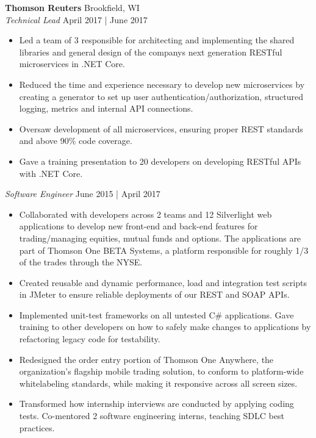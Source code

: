 \documentclass[a4paper]{article}
\begin{document}
\textbf{Thomson Reuters} \hfill Brookfield, WI\\
\textit{Technical Lead} \hfill April 2017 | June 2017\\
\vspace{-1mm}
\begin{itemize} \itemsep 1pt
	\item Led a team of 3 responsible for architecting and implementing the shared libraries and general design of the company\textquotesingle{}s next generation RESTful microservices in .NET Core.
	\item Reduced the time and experience necessary to develop new microservices by creating a generator to set up user authentication/authorization, structured logging, metrics and internal API connections.
	\item Oversaw development of all microservices, ensuring proper REST standards and above 90\% code coverage.
	\item Gave a training presentation to 20 developers on developing RESTful APIs with .NET Core.
\end{itemize}
\vspace{-1mm}
\textit{Software Engineer} \hfill June 2015 | April 2017\\
\vspace{-1mm}
\begin{itemize} \itemsep 1pt
	\item Collaborated with developers across 2 teams and 12 Silverlight web applications to develop new front-end and back-end features for trading/managing equities, mutual funds and options. The applications are part of Thomson One BETA Systems, a platform responsible for roughly 1/3 of the trades through the NYSE.
	\item Created reusable and dynamic performance, load and integration test scripts in JMeter to ensure reliable deployments of our REST and SOAP APIs.
	\item Implemented unit-test frameworks on all untested C\# applications. Gave training to other developers on how to safely make changes to applications by refactoring legacy code   for testability.
	\item Redesigned the order entry portion of Thomson One Anywhere, the organization's flagship mobile trading solution, to conform to platform-wide whitelabeling standards, while making it responsive across all screen sizes.
	\item Transformed how internship interviews are conducted by applying coding tests. Co-mentored 2 software engineering interns, teaching SDLC best practices.
\end{itemize}
\vspace{-1mm}
\end{document}

